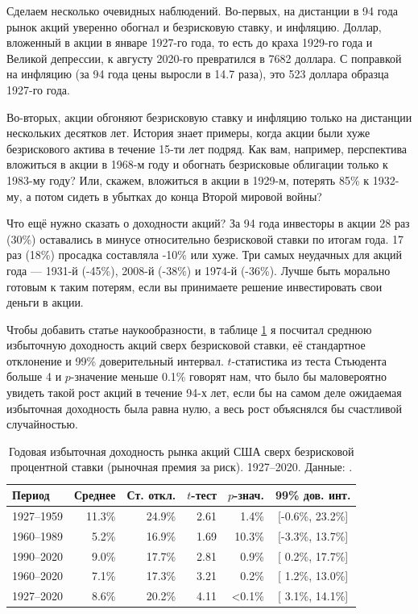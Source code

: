 Сделаем несколько очевидных наблюдений. Во-первых, на дистанции в 94 года рынок 
акций уверенно обогнал и безрисковую ставку, и инфляцию. Доллар, вложенный в 
акции в январе 1927-го года, то есть до краха 1929-го года и Великой депрессии, 
к августу 2020-го превратился в \num{7682} доллара. С поправкой на инфляцию (за 
94 года цены выросли в 14.7 раза), это 523 доллара образца 1927-го года.

Во-вторых, акции обгоняют безрисковую ставку и инфляцию только на дистанции 
нескольких десятков лет. История знает примеры, когда акции были хуже 
безрискового актива в течение 15-ти лет подряд. Как вам, например, перспектива 
вложиться в акции в 1968-м году и обогнать безрисковые облигации только к
1983-му году? Или, скажем, вложиться в акции в 1929-м, потерять 85\% к 1932-му, 
а потом сидеть в убытках до конца Второй мировой войны?

Что ещё нужно сказать о доходности акций? За 94 года инвесторы в акции 28 раз 
(30\%) оставались в минусе относительно безрисковой ставки по итогам года. 17 
раз (18\%) просадка составляла -10\% или хуже. Три самых неудачных для акций 
года --- 1931\nobreakdash-й (-45\%), 2008\nobreakdash-й (-38\%) и 
1974\nobreakdash-й (-36\%). Лучше быть морально готовым к таким потерям, если вы 
принимаете решение инвестировать свои деньги в акции.

Чтобы добавить статье наукообразности, в таблице \ref{us_market_risk_premium} я 
посчитал среднюю избыточную доходность акций сверх безрисковой ставки, её 
стандартное отклонение и 99\% доверительный интервал. $t$-статистика из теста 
Стьюдента больше 4 и $p$-значение меньше 0.1\% говорят нам, что было бы 
маловероятно увидеть такой рост акций в течение 94-х лет, если бы на самом деле 
ожидаемая избыточная доходность была равна нулю, а весь рост объяснялся бы 
счастливой случайностью.

\begin{table}[h!]
\centering
\begin{tabular}{l|r|r|r|r|c}
Период & Среднее & Ст. откл. & $t$-тест & $p$-знач. & 99\% дов. инт. \\
\hline
1927--1959 & 11.3\% & 24.9\% & 2.61 &  1.4\% & [-0.6\%, 23.2\%] \\
1960--1989 & 5.2\%  & 16.9\% & 1.69 & 10.3\% & [-3.3\%, 13.7\%] \\
1990--2020 & 9.0\%  & 17.7\% & 2.81 &  0.9\% & [ 0.2\%, 17.7\%] \\
1960--2020 & 7.1\%  & 17.3\% & 3.21 &  0.2\% & [ 1.2\%, 13.0\%] \\ \hline
1927--2020 & 8.6\%  & 20.2\% & 4.11 & <0.1\% & [ 3.1\%, 14.1\%]
\end{tabular}
\caption{Годовая избыточная доходность рынка акций США сверх безрисковой 
процентной ставки (рыночная премия за риск). 1927--2020. Данные: 
\cite{kennethFrench}.}
\label{us_market_risk_premium}
\end{table}


